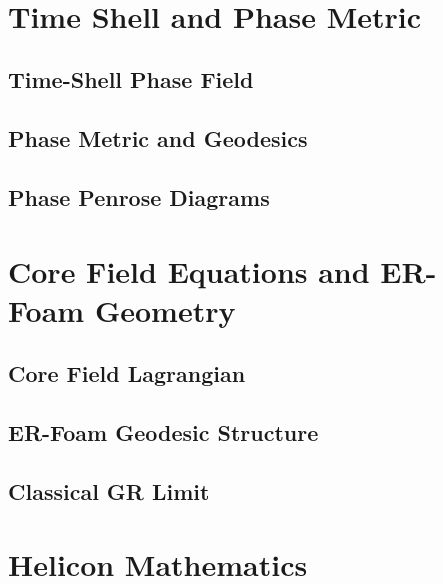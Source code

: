 \

\appendix
\renewcommand{\thesection}{\Alph{section}}
\setcounter{section}{0}

\section{Time Shell and Phase Metric}
\label{app:timeshell}

\subsection{Time-Shell Phase Field}

\subsection{Phase Metric and Geodesics}

\subsection{Phase Penrose Diagrams}

\section{Core Field Equations and ER-Foam Geometry}
\label{app:corefield}

\subsection{Core Field Lagrangian}

\subsection{ER-Foam Geodesic Structure}

\subsection{Classical GR Limit}

\section{Helicon Mathematics}
\label{app:helicon-math}

